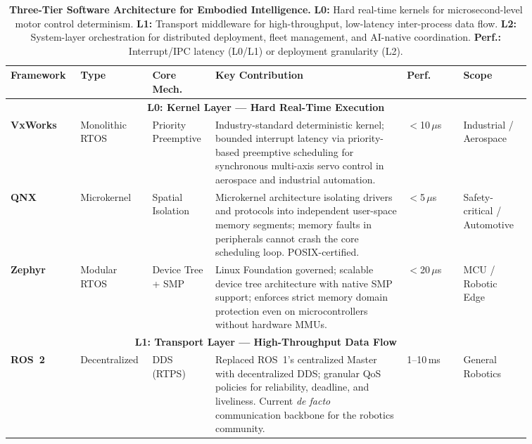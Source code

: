 \documentclass[acmsmall,screen,review,anonymous]{acmart}
\begin{document}
\begin{table}[t]
\centering
\caption{\textbf{Three-Tier Software Architecture for Embodied Intelligence.}
\textbf{L0:} Hard real-time kernels for microsecond-level motor control determinism.
\textbf{L1:} Transport middleware for high-throughput, low-latency inter-process data flow.
\textbf{L2:} System-layer orchestration for distributed deployment, fleet management, and AI-native coordination.
\textbf{Perf.:} Interrupt/IPC latency (L0/L1) or deployment granularity (L2).}\label{tab:framework_comparison}
\renewcommand{\arraystretch}{1.2}
\setlength{\tabcolsep}{3pt}
\scriptsize

\begin{tabular}{
  p{0.11\linewidth}
  p{0.09\linewidth}
  p{0.10\linewidth}
  p{0.34\linewidth}
  p{0.10\linewidth}
  p{0.12\linewidth}
}
\toprule
\textbf{Framework} &
\textbf{Type} &
\textbf{Core Mech.} &
\textbf{Key Contribution} &
\textbf{Perf.} &
\textbf{Scope} \\
\midrule

\multicolumn{6}{c}{\textbf{L0: Kernel Layer --- Hard Real-Time Execution}} \\
\midrule

\textbf{VxWorks} &
Monolithic RTOS &
Priority Preemptive &
Industry-standard deterministic kernel; bounded interrupt latency via priority-based preemptive scheduling for synchronous multi-axis servo control in aerospace and industrial automation. &
$<$10\,$\mu$s &
Industrial / Aerospace \\

\textbf{QNX} &
Microkernel &
Spatial Isolation &
Microkernel architecture isolating drivers and protocols into independent user-space memory segments; memory faults in peripherals cannot crash the core scheduling loop. POSIX-certified. &
$<$5\,$\mu$s &
Safety-critical / Automotive \\

\textbf{Zephyr} &
Modular RTOS &
Device Tree + SMP &
Linux Foundation governed; scalable device tree architecture with native SMP support; enforces strict memory domain protection even on microcontrollers without hardware MMUs. &
$<$20\,$\mu$s &
MCU / Robotic Edge \\

\midrule
\multicolumn{6}{c}{\textbf{L1: Transport Layer --- High-Throughput Data Flow}} \\
\midrule

\textbf{ROS~2}~\cite{macenski2022robot} &
Decentralized &
DDS (RTPS) &
Replaced ROS~1's centralized Master with decentralized DDS\@; granular QoS policies for reliability, deadline, and liveliness. Current \emph{de facto} communication backbone for the robotics community. &
1--10\,ms &
General Robotics \\


\end{tabular}
\end{table}
\end{document}
